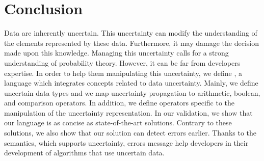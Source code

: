 \section{Conclusion}
\label{sec:conclusion}

Data are inherently uncertain.
This uncertainty can modify the understanding of the elements represented by these data.
Furthermore, it may damage the decision made upon this knowledge.
Managing this uncertainty calls for a strong understanding of probability theory.
However, it can be far from developers expertise.
In order to help them manipulating this uncertainty, we define \langName{}, a language which integrates concepts related to data uncertainty.
Mainly, we define uncertain data types and we map uncertainty propagation to arithmetic, boolean, and comparison operators.
In addition, we define operators specific to the manipulation of the uncertainty representation.
In our validation, we show that our language is as concise as state-of-the-art solutions.
Contrary to these solutions, we also show that our solution can detect errors earlier.
Thanks to the semantics, which supports uncertainty, errors message help developers in their development of algorithms that use uncertain data.